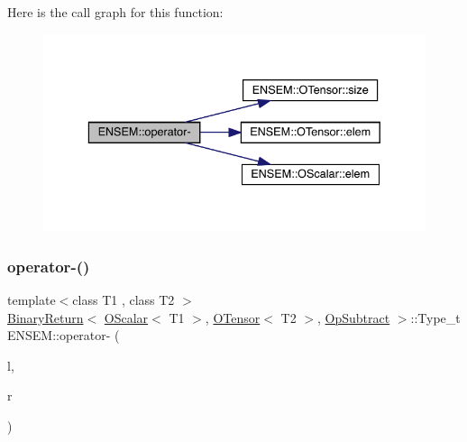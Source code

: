 Here is the call graph for this function\+:\nopagebreak
\begin{figure}[H]
\begin{center}
\leavevmode
\includegraphics[width=336pt]{de/d87/group__obstensor_ga795d9d1bc036d1f9ddcab90e55085d67_cgraph}
\end{center}
\end{figure}
\mbox{\label{group__obstensor_gadc53621528bc3dd8257b504bff4ec21e}} 
\subsubsection{\texorpdfstring{operator-\/()}{operator-()}\hspace{0.1cm}{\footnotesize\ttfamily [4/4]}}
{\footnotesize\ttfamily template$<$class T1 , class T2 $>$ \\
\mbox{\hyperlink{structENSEM_1_1BinaryReturn}{Binary\+Return}}$<$ \mbox{\hyperlink{classENSEM_1_1OScalar}{O\+Scalar}}$<$ T1 $>$, \mbox{\hyperlink{classENSEM_1_1OTensor}{O\+Tensor}}$<$ T2 $>$, \mbox{\hyperlink{structENSEM_1_1OpSubtract}{Op\+Subtract}} $>$\+::Type\+\_\+t E\+N\+S\+E\+M\+::operator-\/ (\begin{DoxyParamCaption}\item[{const \mbox{\hyperlink{classENSEM_1_1OScalar}{O\+Scalar}}$<$ T1 $>$ \&}]{l,  }\item[{const \mbox{\hyperlink{classENSEM_1_1OTensor}{O\+Tensor}}$<$ T2 $>$ \&}]{r }\end{DoxyParamCaption})\hspace{0.3cm}{\ttfamily [inline]}}

